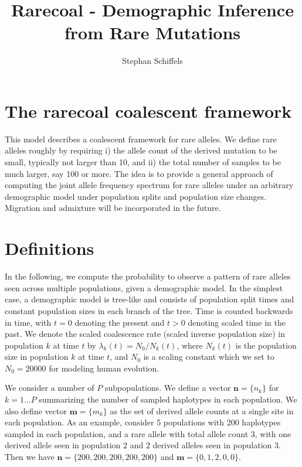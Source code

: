 \documentclass[a4paper]{article}
\begin{document}
\title{Rarecoal - Demographic Inference from Rare Mutations}
\author{Stephan Schiffels}
\date{}
\maketitle


\section{The rarecoal coalescent framework}
This model describes a coalescent framework for rare alleles. We define rare alleles roughly by requiring i) the allele count of the derived mutation to be small, typically not larger than 10, and ii) the total number of samples to be much larger, say 100 or more. The idea is to provide a general approach of computing the joint allele frequency spectrum for rare alleles under an arbitrary demographic model under population splits and population size changes. Migration and admixture will be incorporated in the future.


\section{Definitions}
In the following, we compute the probability to observe a pattern of rare alleles seen across multiple populations, given a demographic model. In the simplest case, a demographic model is tree-like and consists of population split times and constant population sizes in each branch of the tree. Time is counted backwards in time, with $t=0$ denoting the present and $t>0$ denoting scaled time in the past. We denote the scaled coalescence rate (scaled inverse population size) in population $k$ at time $t$ by $\lambda_k(t)=N_0/N_k(t)$, where $N_k(t)$ is the population size in population $k$ at time $t$, and $N_0$ is a scaling constant which we set to $N_0=20000$ for modeling human evolution.

We consider a number of $P$ subpopulations. We define a vector $\mathbf{n}=\{n_k\}$ for $k=1\ldots P$ summarizing the number of sampled haplotypes in each population. We also define vector $\mathbf{m}=\{m_k\}$ as the set of derived allele counts at a single site in each population. As an example, consider 5 populations with 200 haplotypes sampled in each population, and a rare allele with total allele count $3$, with one derived allele seen in population $2$ and $2$ derived alleles seen in population $3$. Then we have $\mathbf{n}=\{200,200,200,200,200\}$ and $\mathbf{m}=\{0,1,2,0,0\}$.
\end{document}

